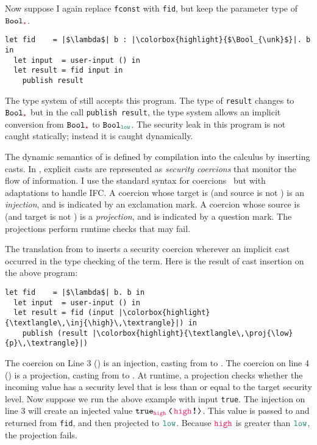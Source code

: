 Now suppose I again replace \texttt{fconst} with \texttt{fid}, but keep the
parameter type of $\Bool_{\unk}$.

\begin{lstlisting}[style=tt]
  let fid    = |$\lambda$| b : |\colorbox{highlight}{$\Bool_{\unk}$}|. b in
  let input  = user-input () in
  let result = fid input in
    publish result
\end{lstlisting}

\noindent The type system of \Surface still accepts this program. The type of
\texttt{result} changes to $\Bool_{\unk}$ but in the call \texttt{publish
  result}, the type system allows an implicit conversion from $\Bool_{\unk}$ to
$\Bool_{\low}$. The security leak in this program is not caught statically;
instead it is caught dynamically.

The dynamic semantics of \Surface is defined by compilation into the \CC
calculus by inserting casts. In \CC, explicit casts are represented as
\textit{security coercions} that monitor the flow of information. I use the
standard syntax for coercions~\parencite{Henglein:1994nz} but with adaptations
to handle IFC. A coercion whose target is \unk (and source is not \unk) is an
\emph{injection}, and is indicated by an exclamation mark. A coercion whose
source is \unk (and target is not \unk) is a \emph{projection}, and is indicated
by a question mark. The projections perform runtime checks that may fail.

The translation from \Surface to \CC inserts a security coercion wherever an
implicit cast occurred in the type checking of the \Surface term. Here is the
result of cast insertion on the above program:

\begin{lstlisting}[style=tt]
  let fid    = |$\lambda$| b. b in
  let input  = user-input () in
  let result = fid (input |\colorbox{highlight}{\textlangle\,\inj{\high}\,\textrangle}|) in
    publish (result |\colorbox{highlight}{\textlangle\,\proj{\low}{p}\,\textrangle}|)
\end{lstlisting}

The coercion on Line 3 (\inj{\high}) is an injection, casting from \high to
\unk.
%
The coercion on line 4 () is a projection, casting from \unk to
\low.
%
At runtime, a projection checks whether the incoming value has a security level
that is less than or equal to the target security level.
%
Now suppose we run the above example with input \texttt{true}. The injection on
line 3 will create an injected value $\cccast{\true_{\high}}{\inj{\high}}$. This
value is passed to and returned from \texttt{fid}, and then projected to $\low$.
Because $\high$ is greater than $\low$, the projection fails.

